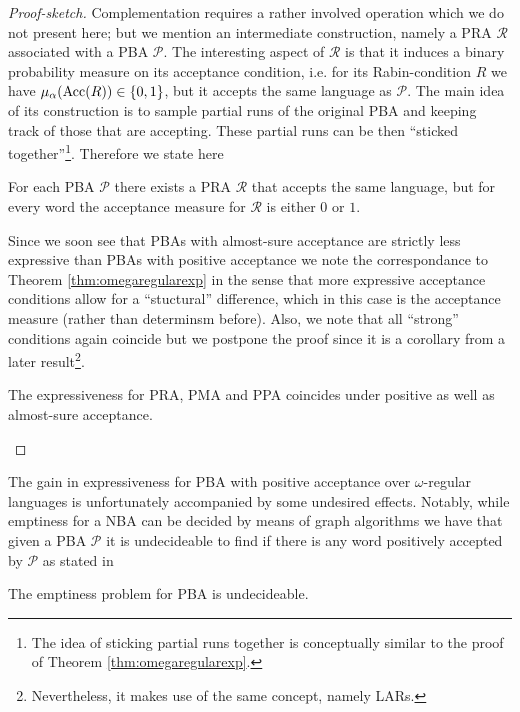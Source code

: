 \begin{proof}[Proof-sketch]
  Complementation requires a rather involved operation which we do not present 
  here; but we mention an intermediate construction, namely a \ac{PRA} 
  $\mathcal{R}$ associated with a \ac{PBA} $\mathcal{P}$. The 
  interesting aspect of $\mathcal{R}$ is that it induces a binary probability 
  measure on its acceptance condition, i.e. for its Rabin-condition $R$ we have
  $\mu_{\alpha}(\operatorname{Acc}(R))\in\left\{0,1\right\}$, but it accepts the same language as
  $\mathcal{P}$. The main idea of its construction is to sample partial runs of 
  the original \ac{PBA} and keeping track of those that are accepting. These 
  partial runs can be then \enquote{sticked together}\footnote{The idea of 
  sticking partial runs together is conceptually similar to the proof of 
  Theorem \ref{thm:omegaregularexp}.}. Therefore we state here
  \begin{theorem}
    \cite[Theorem 4.3.2]{Groesser}
    For each \ac{PBA} $\mathcal{P}$ there exists a \ac{PRA} $\mathcal{R}$ that 
    accepts the same language, but for every word the acceptance measure for
    $\mathcal{R}$ is either $0$ or $1$.
    \label{thm:pbatopra}
  \end{theorem}
  Since we soon see that \acp{PBA} with almost-sure acceptance are strictly
  less expressive than \acp{PBA} with positive acceptance we note the 
  correspondance to Theorem \ref{thm:omegaregularexp} in the
  sense that more expressive acceptance conditions allow for a 
  \enquote{stuctural} difference, which in this case is the acceptance measure
  (rather than determinsm before). Also, we note that all \enquote{strong} 
  conditions again coincide but we postpone the proof since it is a corollary 
  from a later result\footnote{
    Nevertheless, it makes use of the same concept, namely \acp{LAR}.
  }.
  \begin{theorem}
    The expressiveness for \ac{PRA}, \ac{PMA} and \ac{PPA} coincides under
    positive as well as almost-sure acceptance.
    \label{thm:probautoequiv}
  \end{theorem}
\end{proof}
The gain in expressiveness for \ac{PBA} with positive acceptance over 
$\omega$-regular languages is unfortunately accompanied by some undesired 
effects. Notably, while emptiness for a \ac{NBA} can be decided by means of 
graph algorithms we have that given a \ac{PBA} $\mathcal{P}$ it is undecideable 
to find if there is any word positively accepted by $\mathcal{P}$ as stated in
\begin{theorem}
  \cite[Theorem 2]{DecProblemsForProbAuto}
  The emptiness problem for \ac{PBA} is undecideable.
  \label{thm:emptinesspospba}
\end{theorem}

